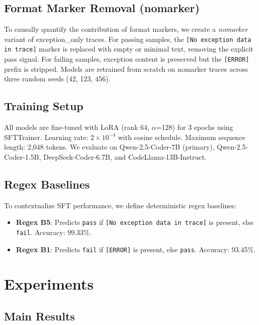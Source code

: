 \documentclass[11pt,a4paper]{article}
\begin{document}
\subsection{Format Marker Removal (nomarker)}
\label{sec:nomarker-method}

To causally quantify the contribution of format markers, we create a \emph{nomarker} variant of exception\_only traces.
For passing samples, the \texttt{[No exception data in trace]} marker is replaced with empty or minimal text, removing the explicit pass signal.
For failing samples, exception content is preserved but the \texttt{[ERROR]} prefix is stripped.
Models are retrained from scratch on nomarker traces across three random seeds (42, 123, 456).

\subsection{Training Setup}

All models are fine-tuned with LoRA (rank 64, $\alpha$=128) for 3 epochs using SFTTrainer.
Learning rate: $2 \times 10^{-4}$ with cosine schedule.
Maximum sequence length: 2,048 tokens.
We evaluate on Qwen-2.5-Coder-7B (primary), Qwen-2.5-Coder-1.5B, DeepSeek-Coder-6.7B, and CodeLlama-13B-Instruct.

\subsection{Regex Baselines}

To contextualize SFT performance, we define deterministic regex baselines:
\begin{itemize}
    \item \textbf{Regex B5}: Predicts \texttt{pass} if \texttt{[No exception data in trace]} is present, else \texttt{fail}. Accuracy: 99.33\%.
    \item \textbf{Regex B1}: Predicts \texttt{fail} if \texttt{[ERROR]} is present, else \texttt{pass}. Accuracy: 93.45\%.
\end{itemize}

\section{Experiments}
\label{sec:experiments}

\subsection{Main Results}
\label{sec:main-results}
\end{document}
